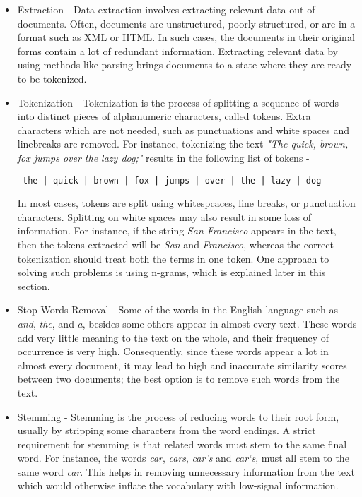 \begin{itemize}
    \item{
    Extraction - Data extraction involves extracting relevant data out of documents. Often, documents are unstructured, poorly structured, or are in a format such as XML or HTML. In such cases, the documents in their original forms contain a lot of redundant information. Extracting relevant data by using methods like parsing brings documents to a state where they are ready to be tokenized.
    }
    \item{
    Tokenization - Tokenization is the process of splitting a sequence of words into distinct pieces of alphanumeric characters, called tokens. Extra characters which are not needed, such as punctuations and white spaces and linebreaks are removed. For instance, tokenizing the text \emph{"The quick, brown, fox jumps over the lazy dog;"} results in the following list of tokens - \\
    \begin{center}
        \begin{verbatim} the | quick | brown | fox | jumps | over | the | lazy | dog \end{verbatim}
    \end{center}
    In most cases, tokens are split using whitespcaces, line breaks, or punctuation characters. Splitting on white spaces may also result in some loss of information. For instance, if the string \emph{San Francisco} appears in the text, then the tokens extracted will be \emph{San} and \emph{Francisco}, whereas the correct tokenization should treat both the terms in one token. One approach to solving such problems is using n-grams, which is explained later in this section.
    }
    \item{
    Stop Words Removal - Some of the words in the English language such as \emph{and}, \emph{the}, and \emph{a}, besides some others appear in almost every text. These words add very little meaning to the text on the whole, and their frequency of occurrence is very high. Consequently, since these words appear a lot in almost every document, it may lead to high and inaccurate similarity scores between two documents; the best option is to remove such words from the text.
    }
    \item{
    Stemming - Stemming is the process of reducing words to their root form, usually by stripping some characters from the word endings. A strict requirement for stemming is that related words must stem to the same final word. For instance, the words \emph{car}, \emph{cars}, \emph{car's} and \emph{car`s}, must all stem to the same word \emph{car}. This helps in removing unnecessary information from the text which would otherwise inflate the vocabulary with low-signal information.
    }
\end{itemize}

